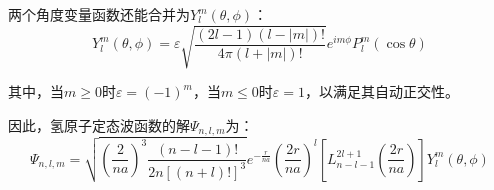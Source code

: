两个角度变量函数还能合并为$Y_l^m(\theta,\phi)$：
\[Y_l^m(\theta,\phi)=\varepsilon \sqrt{\frac{(2l-1)(l-|m|)!}{4 \pi (l+|m|)!}}e^{im\phi}P^{m}_l(\cos\theta)\]

其中，当$m \geq 0$时$\varepsilon=(-1)^m$，当$m \leq 0$时$\varepsilon=1$，以满足其自动正交性。

因此，氢原子定态波函数的解$\varPsi_{n,l,m}$为：
\[\varPsi_{n,l,m}=\sqrt{ \left (\frac{2}{na} \right )^3 \frac{(n-l-1)!}{2n[(n+l)!]^3}}e^{-\frac{r}{na}}\left (\frac{2r}{na} \right )^l \left [L_{n-l-1}^{2l+1} \left ( \frac{2r}{na} \right ) \right ]Y_l^m(\theta,\phi)\]
